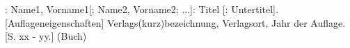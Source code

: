 \begin{thebibliography}{XXXXXX-JJJJa}



\renewcommand{\bibname}{A. ~Literaturverzeichnis}
\setcounter{chapter}{1}



\bibitem [DJAN-2013]: Name1, Vorname1[; Name2, Vorname2; ...]: Titel [: Untertitel]. [Auflageneigenschaften] Verlags(kurz)bezeichnung, Verlagsort, Jahr der Auflage. [S. xx - yy.] (Buch)

\end{thebibliography}